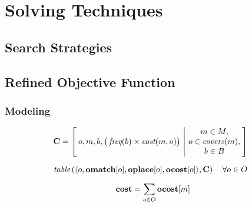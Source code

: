 %

\chapter{Solving Techniques}

\section{Search Strategies}

\section{Refined Objective Function}
\subsection{Modeling}

\begin{equation}
  \hspace*{-2mm} %
  \mCostMatrix =
  \begin{bmatrix}
    \begin{array}{@{\:}c|c@{\:}}
        o, m, b, \big( \mFreq(b) \times \mOpCost(m, o) \big)
      & \begin{array}{@{}c@{}}
          m \in \mMatchSet, \\
          o \in \mCovers(m), \\
          b \in \mBlockSet \\
        \end{array}
    \end{array}
  \end{bmatrix}
  \labelEquation{cost-matrix}
\end{equation}

\begin{equation}
  \hspace*{-2mm} %
  \mTable\left(
    \langle
      o,
      \mVar{omatch}[o],
      \mVar{oplace}[o],
      \mVar{ocost}[o]
    \rangle,
    \mCostMatrix
  \right)
  \mQuantSep
  \forall o \in \mOpSet
  \labelEquation{omatch-oplace-ocost-connection}
\end{equation}

\begin{equation}
  \mVar{cost} = \sum_{o \in \mOpSet} \mVar{ocost}[m]
  \labelEquation{total-cost}
\end{equation}

